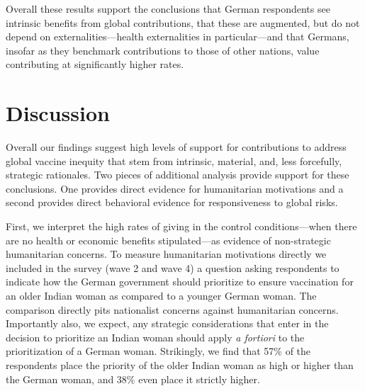 \documentclass[]{article}
\begin{document}
Overall these results support the conclusions that German respondents see intrinsic benefits from global contributions, that these are augmented, but do not depend on externalities---health externalities in particular---and that Germans, insofar as they benchmark contributions to those of other nations, value contributing at significantly higher rates.



\section{Discussion}

Overall our findings suggest high levels of support for contributions to address global vaccine inequity that stem from intrinsic, material, and, less forcefully, strategic rationales. Two pieces of additional analysis provide support for these conclusions. One provides direct evidence for humanitarian motivations and a second provides direct behavioral evidence for responsiveness to global risks.  



First, we interpret the high rates of giving in the control conditions---when there are no health or economic benefits stipulated---as evidence of non-strategic humanitarian concerns. To measure humanitarian motivations directly we included in the survey (wave 2 and wave 4) a question asking respondents to indicate how  the German government should prioritize to ensure vaccination for an older Indian woman as compared to a younger German woman. The comparison directly pits nationalist concerns against humanitarian concerns. Importantly also, we expect, any strategic considerations that enter in the decision to prioritize an Indian woman should apply \textit{a fortiori} to the prioritization of a German woman. Strikingly, we find that 57\% of the respondents place the priority of the older Indian woman as high or higher than the German woman, and 38\% even place it strictly higher. 
\end{document}
